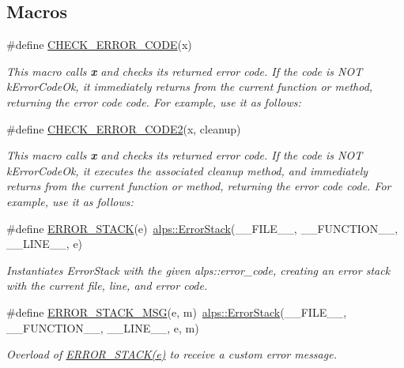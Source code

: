 \subsection*{Macros}
\begin{DoxyCompactItemize}
\item 
\#define \hyperlink{group__ERRORCODES_gaa3832e1d1faf1540161d389edf2a9c17}{C\+H\+E\+C\+K\+\_\+\+E\+R\+R\+O\+R\+\_\+\+C\+O\+DE}(x)
\begin{DoxyCompactList}\small\item\em This macro calls {\bfseries x} and checks its returned error code. If the code is N\+OT k\+Error\+Code\+Ok, it immediately returns from the current function or method, returning the error code code. For example, use it as follows\+: \end{DoxyCompactList}\item 
\#define \hyperlink{group__ERRORCODES_ga283b8666b5462568e91bf8b7f1fb950e}{C\+H\+E\+C\+K\+\_\+\+E\+R\+R\+O\+R\+\_\+\+C\+O\+D\+E2}(x,  cleanup)
\begin{DoxyCompactList}\small\item\em This macro calls {\bfseries x} and checks its returned error code. If the code is N\+OT k\+Error\+Code\+Ok, it executes the associated cleanup method, and immediately returns from the current function or method, returning the error code code. For example, use it as follows\+: \end{DoxyCompactList}\item 
\#define \hyperlink{group__ERRORCODES_gaf2fc6952d71aa10a52c326a27a0746da}{E\+R\+R\+O\+R\+\_\+\+S\+T\+A\+CK}(e)~\hyperlink{classalps_1_1ErrorStack}{alps\+::\+Error\+Stack}(\+\_\+\+\_\+\+F\+I\+L\+E\+\_\+\+\_\+, \+\_\+\+\_\+\+F\+U\+N\+C\+T\+I\+O\+N\+\_\+\+\_\+, \+\_\+\+\_\+\+L\+I\+N\+E\+\_\+\+\_\+, e)
\begin{DoxyCompactList}\small\item\em Instantiates Error\+Stack with the given alps\+::error\+\_\+code, creating an error stack with the current file, line, and error code. \end{DoxyCompactList}\item 
\#define \hyperlink{group__ERRORCODES_ga8393b83844a39ac9c2d80e86c1afd073}{E\+R\+R\+O\+R\+\_\+\+S\+T\+A\+C\+K\+\_\+\+M\+SG}(e,  m)~\hyperlink{classalps_1_1ErrorStack}{alps\+::\+Error\+Stack}(\+\_\+\+\_\+\+F\+I\+L\+E\+\_\+\+\_\+, \+\_\+\+\_\+\+F\+U\+N\+C\+T\+I\+O\+N\+\_\+\+\_\+, \+\_\+\+\_\+\+L\+I\+N\+E\+\_\+\+\_\+, e, m)
\begin{DoxyCompactList}\small\item\em Overload of \hyperlink{group__ERRORCODES_gaf2fc6952d71aa10a52c326a27a0746da}{E\+R\+R\+O\+R\+\_\+\+S\+T\+A\+C\+K(e)} to receive a custom error message. \end{DoxyCompactList}\item 

\end{DoxyCompactItemize}
